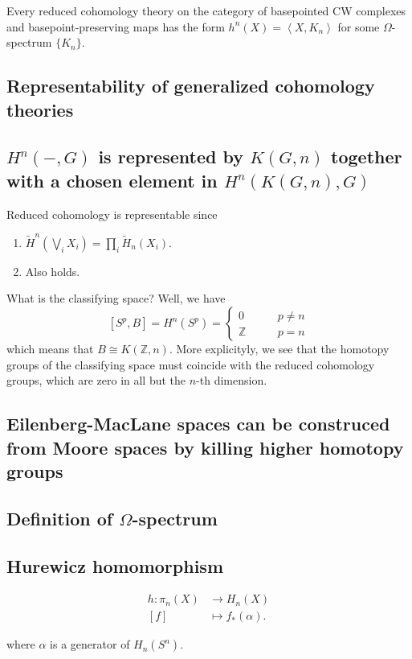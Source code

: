\begin{thm}[4E.1]
	Every reduced cohomology theory on the category of basepointed CW complexes and basepoint-preserving maps has the form $h^{n} (X)=\left<X,K_{n} \right> $ for some $\Omega$-spectrum $\{K_{n}\} $.
\end{thm}


\subsection{Representability of generalized cohomology theories}

\subsection{$H^{n}(-,G)$ is represented by  $K(G,n)$ together with a chosen element in $H^{n}(K(G,n),G)$}

Reduced cohomology is representable since

\begin{enumerate}[label=(\roman*)]
	\item $\widetilde{H}^{n}(\bigvee_{i}X_{i})=\prod_{i} \widetilde{H}_{n}(X_{i})$.
	\item Also holds. 
\end{enumerate}

What is the classifying space? Well, we have
\[[S^{p},B]=H^{n}(S^{p})=\begin{cases}
	0\qquad &p\neq n\\
	\mathbb{Z}\qquad &p=n
\end{cases}\]
which means that $B\cong K(\mathbb{Z},n)$. More explicityly, we see that the homotopy groups of the classifying space must coincide with the reduced cohomology groups, which are zero in all but the $n$-th dimension.

\subsection{Eilenberg-MacLane spaces can be construced from Moore spaces by killing higher homotopy groups}
\subsection{Definition of $\Omega$-spectrum}


\subsection{Hurewicz homomorphism}
\begin{defn}
	\begin{align*}
		h: \pi_{n}(X) &\longrightarrow H_{n}(X) \\
		[f] &\longmapsto f_{*}(\alpha)
	.\end{align*}
\end{defn}
where $\alpha$ is a generator of $ H_{n}(S^{n})$.

